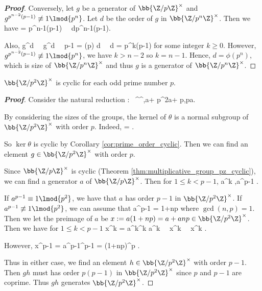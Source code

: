 \begin{proof}[\bf Proof]
Conversely, let $g$ be a generator of $\bb{\Z/p\Z}^\times$ and $g^{p^{n-2}(p-1)} \not\equiv 1 \lmod{p^n}$. Let $d$ be the order of $g$ in $\bb{\Z/p^n\Z}^\times$. Then we have
\be
\phi{} = p^{n-1}(p-1) \ \ra\ d\mid p^{n-1}(p-1).
\ee

Also,
\be
g^d   \ \ra\ g^d   \ \ra\ p-1 = \phi(p) \mid d \ \ra\ d = p^k(p-1)
\ee
for some integer $k\geq 0$. However, $g^{p^{n-2}(p-1)} \not\equiv 1 \lmod{p^n}$, we have $k>n-2$ so $k=n-1$. Hence, $d = \phi(p^n)$, which is size of $\bb{\Z/p^n\Z}^\times$ and thus $g$ is a generator of $\bb{\Z/p^n\Z}^\times$.
\end{proof}


\begin{lemma}\label{lem:multiplicative_group_zp2z_cyclic}
$\bb{\Z/p^2\Z}^\times$ is cyclic for each odd prime number $p$.
\end{lemma}

\begin{proof}[\bf Proof]%
Consider the natural reduction
\be
\theta: \ ^\times \to {}^\times,\quad a+ p^2\Z \mapsto a+ p\Z,\qquad p\nmid a.%
\ee

%

By considering the sizes of the groups, the kernel of $\theta$ is a normal subgroup of $\bb{\Z/p^2\Z}^\times$ with order $p$. Indeed,
\be
\ker\theta = .
\ee

So $\ker\theta$ is cyclic by Corollary \ref{cor:prime_order_cyclic}. Then we can find an element $g\in \bb{\Z/p^2\Z}^\times$ with order $p$.

Since $\bb{\Z/p\Z}^\times$ is cyclic (Theorem \ref{thm:multiplicative_group_pz_cyclic}), we can find a generator $a$ of $\bb{\Z/p\Z}^\times$. Then for $1\leq k< p-1$,
\be
a^{k} \not{} ,\quad a^{p-1} .
\ee

If $a^{p-1}\equiv 1\lmod{p^2}$, we have that $a$ has order $p-1$ in $\bb{\Z/p^2\Z}^\times$. If $a^{p-1}\not\equiv 1\lmod{p^2}$, we can assume that
\be
a^{p-1} = 1+np
\ee
where $\gcd(n,p)=1$. Then we let the preimage of $a$ be $x := a(1+np) = a + anp \in \bb{\Z/p^2\Z}^\times$. %
Then we have for $1\leq k < p-1$
\be
x^{k} = a^k^k \equiv a^k  \ \ra\ x^k \not{} \ \ra\ x^k \not{} .
\ee

However,
\be
x^{p-1} = a^{p-1}^{p-1} = (1+np)^p  .%
\ee

Thus in either case, we find an element $h\in \bb{\Z/p^2\Z}^\times$ with order $p-1$. Then $gh$ must has order $p(p-1)$ in $\bb{\Z/p^2\Z}^\times$ since $p$ and $p-1$ are coprime. Thus $gh$ generates $\bb{\Z/p^2\Z}^\times$.



\end{proof}%

